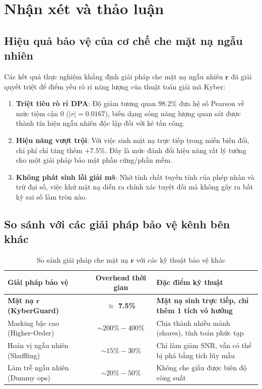 \documentclass[../LuanVan.tex]{subfiles}
\begin{document}
\section{Nhận xét và thảo luận}
\label{sec:nhanxet}

\subsection{Hiệu quả bảo vệ của cơ chế che mặt nạ ngẫu nhiên}

Các kết quả thực nghiệm khẳng định giải pháp che mặt nạ ngẫu nhiên $\mathbf{r}$ đã giải quyết triệt để điểm yếu rò rỉ năng lượng của thuật toán giải mã Kyber:
\begin{enumerate}[leftmargin=2cm]
    \item \textbf{Triệt tiêu rò rỉ DPA}: Độ giảm tương quan $98.2\%$ đưa hệ số Pearson về mức tiệm cận $0$ ($|r| = 0.0167$), biến dạng sóng năng lượng quan sát được thành tín hiệu ngẫu nhiên độc lập đối với kẻ tấn công.
    \item \textbf{Hiệu năng vượt trội}: Với việc sinh mặt nạ trực tiếp trong miền biến đổi, chi phí chỉ tăng thêm $+7.5\%$. Đây là mức đánh đổi hiệu năng rất lý tưởng cho một giải pháp bảo mật phần cứng/phần mềm.
    \item \textbf{Không phát sinh lỗi giải mã}: Nhờ tính chất tuyến tính của phép nhân và trừ đại số, việc khử mặt nạ diễn ra chính xác tuyệt đối mà không gây ra bất kỳ sai số làm tròn nào.
\end{enumerate}

\subsection{So sánh với các giải pháp bảo vệ kênh bên khác}

\begin{table}[H]
\centering
\caption{So sánh giải pháp che mặt nạ $\mathbf{r}$ với các kỹ thuật bảo vệ khác}
\label{tab:overhead_comparison}
\begin{tabular}{l c l}
\toprule
\textbf{Giải pháp bảo vệ} & \textbf{Overhead thời gian} & \textbf{Đặc điểm kỹ thuật} \\
\midrule
\textbf{Mặt nạ $\mathbf{r}$ (KyberGuard)} & \textbf{$\approx$ 7.5\%} & \textbf{Mặt nạ sinh trực tiếp, chỉ thêm 1 tích vô hướng} \\
Masking bậc cao (Higher-Order) & $\sim 200\% - 400\%$ & Chia thành nhiều mảnh (shares), tính toán phức tạp \\
Hoán vị ngẫu nhiên (Shuffling) & $\sim 15\% - 30\%$ & Chỉ làm giảm SNR, vẫn có thể bị phá bằng tích lũy mẫu \\
Làm trễ ngẫu nhiên (Dummy ops) & $\sim 20\% - 50\%$ & Không che giấu được biên độ công suất \\
\bottomrule
\end{tabular}
\end{table}
\end{document}
